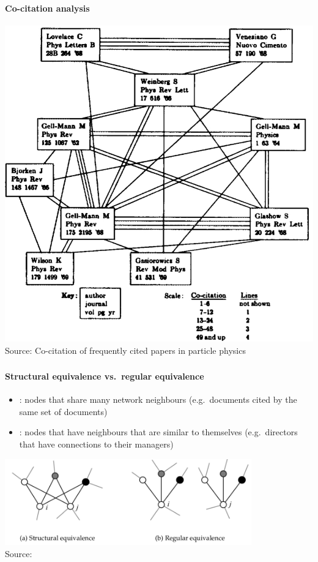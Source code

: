\documentclass[8pt]{beamer}
\begin{document}
\begin{frame}
\frametitle{\insertsection}
\framesubtitle{Co-citation analysis}

\centering
\includegraphics[height=0.8\textheight]{cocitation}\\
\tiny{Source: Co-citation of frequently cited papers in particle physics \cite{Small1973}}

\end{frame}


\begin{frame}
\frametitle{\insertsection}
\framesubtitle{Structural equivalence vs.\ regular equivalence}

\begin{itemize}
	\item {\color{blue}{Structural equivalence}}: nodes that share many network neighbours (e.g.\ documents cited by the same set of documents)
	\item  {\color{blue}{Regular equivalence}}: nodes that have neighbours that are similar to themselves (e.g.\ directors that have connections to their managers)
\end{itemize}


\centering
\includegraphics[width = 0.8\textwidth]{equivalence}\\
\tiny{Source: \cite{Newman2010}}

\end{frame}
\end{document}
